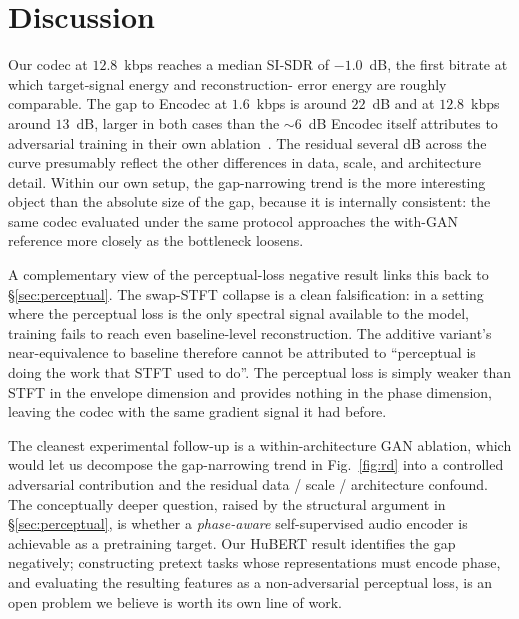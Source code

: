 \documentclass[11pt]{article}
\begin{document}
\section{Discussion}

Our codec at $12.8$~kbps reaches a median SI-SDR of $-1.0$~dB,
the first bitrate at which target-signal energy and reconstruction-
error energy are roughly comparable. The gap to Encodec at
$1.6$~kbps is around $22$~dB and at $12.8$~kbps around $13$~dB,
larger in both cases than the $\sim 6$~dB Encodec itself attributes
to adversarial training in their own
ablation~\citep[\S3.5]{defossez2022high}. The residual several dB
across the curve presumably reflect the other differences in data,
scale, and architecture detail. Within our own setup, the
gap-narrowing trend is the more interesting object than the absolute
size of the gap, because it is internally consistent: the same
codec evaluated under the same protocol approaches the with-GAN
reference more closely as the bottleneck loosens.

A complementary view of the perceptual-loss negative result links
this back to \S\ref{sec:perceptual}. The swap-STFT collapse is a
clean falsification: in a setting where the perceptual loss is the
only spectral signal available to the model, training fails to
reach even baseline-level reconstruction. The additive variant's
near-equivalence to baseline therefore cannot be attributed to
``perceptual is doing the work that STFT used to do''. The
perceptual loss is simply weaker than STFT in the envelope
dimension and provides nothing in the phase dimension, leaving the
codec with the same gradient signal it had before.

The cleanest experimental follow-up is a within-architecture GAN
ablation, which would let us decompose the gap-narrowing trend in
Fig.~\ref{fig:rd} into a controlled adversarial contribution and the
residual data / scale / architecture confound. The conceptually
deeper question, raised by the structural argument in
\S\ref{sec:perceptual}, is whether a \emph{phase-aware}
self-supervised audio encoder is achievable as a pretraining target.
Our HuBERT result identifies the gap negatively; constructing
pretext tasks whose representations must encode phase, and
evaluating the resulting features as a non-adversarial perceptual
loss, is an open problem we believe is worth its own line of work.

\end{document}

